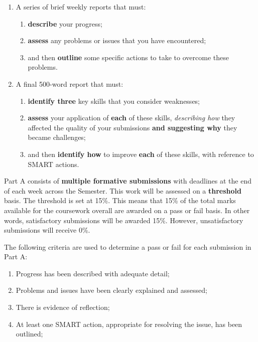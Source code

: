 \documentclass{../fal_assignment}
\begin{document}
\begin{enumerate}[label=(\alph*)]
    \item A series of brief weekly reports that must:
    	\begin{enumerate}[label=\roman*.]
    		\item \textbf{describe} your progress;
    		\item \textbf{assess} any problems or issues that you have encountered;
    		\item and then \textbf{outline} some specific actions to take to overcome these problems.
	\end{enumerate}
    \item A final 500-word report that must:
    	\begin{enumerate}[label=\roman*.]
    		\item \textbf{identify three} key skills that you consider weaknesses;
    		\item \textbf{assess} your application of \textbf{each} of these skills, \textit{describing how} they affected the quality of your submissions \textbf{and suggesting why} they became challenges;
    		\item and then \textbf{identify how} to improve \textbf{each} of these skills, with reference to SMART actions.
	\end{enumerate}
\end{enumerate}

Part A consists of \textbf{multiple formative submissions} with deadlines at the end of each week across the Semester. This work will be assessed on a \textbf{threshold} basis. The threshold is set at 15\%. This means that 15\% of the total marks available for the coursework overall are awarded on a pass or fail basis. In other words, satisfactory submissions will be awarded 15\%. However, unsatisfactory submissions will receive 0\%.

The following criteria are used to determine a pass or fail for each submission in Part A:

\begin{enumerate}[label=(\alph*)]
	\item Progress has been described with adequate detail;
	\item Problems and issues have been clearly explained and assessed;
	\item There is evidence of reflection;
	\item At least one SMART action, appropriate for resolving the issue, has been outlined;
\end{enumerate}
\end{document}
